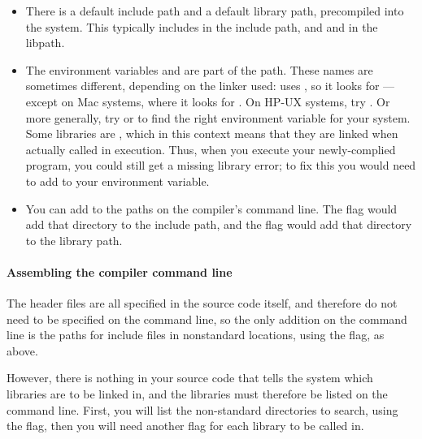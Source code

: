 \begin{itemize}
\item There is a default include path and a default library path,
precompiled into the system. This typically includes 
 in the include path, and  and 
in the libpath.
\item The environment variables  and  are
part of the path. These names are sometimes different, depending on the linker
used:  uses , so it looks for
---except on Mac systems, where it looks for
. On HP-UX systems, try . Or more
generally, try  or  to find the right environment
variable for your system. Some libraries are , which in
this context means that they are linked when actually called in
execution. Thus, when you execute your newly-complied program, you could
still get a missing library error; to fix this you would need to add to
your  environment variable.
\item You can add to the paths on the compiler's command line. The flag
 would add that directory to the include path,
and the flag  would add that directory to the
library path. 
\end{itemize}

\paragraph{Assembling the compiler command line} The header files are
all specified in the source code itself, and therefore do not need to
be specified on the command line, so the only addition on the command
line is the paths for include files in nonstandard locations, using the
 flag, as above.

However, there is nothing in your source code that tells the system which
libraries are to be linked in, and the libraries must therefore be listed
on the command line. First, you will list the non-standard directories
to search, using the  flag, then you will need another flag for
each library to be called in.

